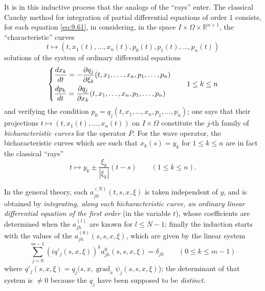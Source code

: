 \documentclass[12pt,a4paper,leqno,twoside]{extbook}
\newcommand{\R}{\mathbb{R}}
\newcommand{\grad}{\operatorname{grad}}
\newcommand{\der}[2]{\frac{d #1}{d #2}}
\newcommand{\pder}[2]{\frac{\partial #1}{\partial #2}}
\begin{document}
It is in this inductive process that the analogs of the ``rays'' enter. The classical Cauchy method for integration of partial differential equations of order 1 consists, for each equation \eqref{eq:9.61}, in considering, in the space \(I \times \Omega \times \R^{n+1}\), the ``characteristic'' curves
\[
    t \mapsto (t, x_1(t), \ldots, x_n(t), p_0(t), p_1(t), \ldots, p_n(t))
\]
solutions of the system of ordinary differential equations
\begin{equation}
    \label{eq:9.65}
    \begin{dcases}
        \der{x_k}{t} = -\pder{q_j}{\xi_k} (t, x_1, \ldots, x_n, p_1, \ldots, p_n) \\
        \der{p_k}{t} = \pder{q_j}{x_k} (t, x_1, \ldots, x_n, p_1, \ldots, p_n)
    \end{dcases}
    \qquad
    1 \leq k \leq n
\end{equation}
and verifying the condition \(p_0 = q_j(t, x_1, \ldots, x_n, p_1, \ldots, p_n)\); one says that their projections \(t \mapsto (t, x_1(t), \ldots, x_n(t))\) on \(I \times \Omega\) constitute the \(j\)-th family of \emph{bicharacteristic curves} for the operator \(P\). For the wave operator, the bicharacteristic curves which are such that \(x_k(s) = y_k\) for \(1 \leq k \leq n\) are in fact the classical ``rays''
\[
    t \mapsto y_k \pm \frac{\xi_k}{|\xi_k|}(t-s) \qquad (1 \leq k \leq n).
\]

In the general theory, each \(a^{(N)}_{jh}(t,s,x,\xi)\) is taken independent of \(y\), and is obtained by \emph{integrating, along each bicharacteristic curve, an ordinary linear differential equation of the first order} (in the variable \(t\)), whose coefficients are determined when the \(a^{(l)}_{jh}\) are known for \(l \leq N-1\); finally the induction starts with the values of the \(a^{(0)}_{jh}(s,s,x,\xi)\), which are given by the linear system
\begin{equation}
    \label{eq:9.66}
    \sum_{j=0}^{m-1} (i q'_j(s,x,\xi))^k a^{0}_{jh}(s,s,x,\xi) = \delta_{jh} \qquad (0 \leq k \leq m-1)
\end{equation}
where \(q'_j(s,x,\xi) = q_j(s,x,\grad_x{\psi_j(s,s,x,\xi)}\)); the determinant of that system is \(\neq 0\) because the \(q_j\) have been supposed to be \emph{distinct}.
\end{document}
